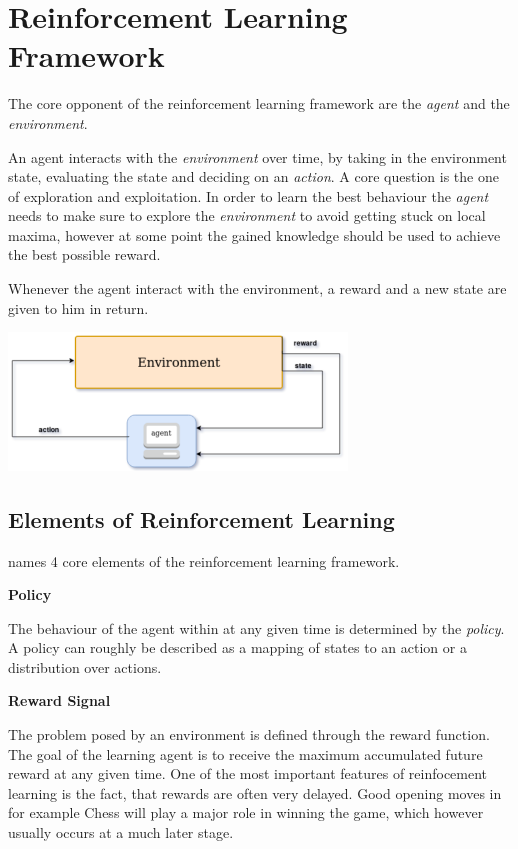 \section{Reinforcement Learning Framework}\raggedbottom 
The core opponent of the reinforcement learning framework are the \textit{agent} and the \textit{environment}.

An agent interacts with the \textit{environment} over time, by taking in the environment state, evaluating the state and deciding on an \textit{action}. 
A core question is the one of exploration and exploitation. In order to learn the best behaviour the \textit{agent} needs to make sure to explore the \textit{environment} to avoid getting stuck on local maxima, however at some point the gained knowledge should be used to achieve the best possible reward.

Whenever the agent interact with the environment, a reward and a new state are given to him in return.

\includegraphics[width=90mm]{bilder/RLFramework.png}
\subsection{Elements of Reinforcement Learning}
\citet{Sut98} names 4 core elements of the reinforcement learning framework.

\textbf{Policy}

The behaviour of the agent within at any given time is determined by the \textit{policy}. A policy can roughly be described as a mapping of states to an action or a distribution over actions. 

\textbf{Reward Signal}

The problem posed by an environment is defined through the reward function. The goal of the learning agent is to receive the maximum accumulated future reward at any given time. One of the most important features of reinfocement learning is the fact, that rewards are often very delayed. Good opening moves in for example Chess will play a major role in winning the game, which however usually occurs at a much later stage. 

